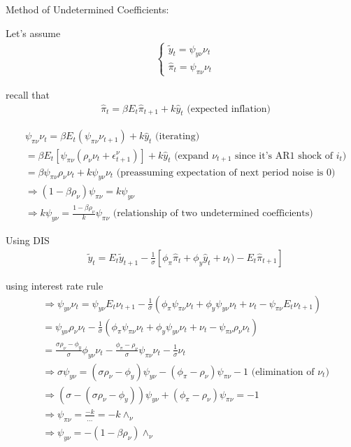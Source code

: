 \documentclass{article}
\begin{document}
Method of Undetermined Coefficients:

Let's assume 
\begin{align}
&\begin{cases}
  \tilde y_t = \psi_{y \nu} \nu_t
  \\
  \hat \pi_t = \psi_{\pi \nu} \nu_t
\end{cases}
\end{align}

recall that
\begin{align}
&\hat \pi_t = \beta E_t \hat \pi_{t+1}+k \hat y_t \text{ (expected inflation)}
\end{align}

\begin{align}
& \psi_{\pi \nu} \nu_t= \beta E_t (\psi_{\pi \nu} \nu_{t+1})+k \hat y_t \text{ (iterating)}
\\& = \beta E_t [\psi_{\pi \nu} (\rho_\nu \nu_t +\epsilon_{t+1}^\nu)]+k \hat y_t
\text{ (expand $\nu_{t+1}$ since it's AR1 shock of $i_t$)}
\\& = \beta \psi_{\pi \nu} \rho_\nu \nu_t + k \psi_{y \nu} \nu_t
\text{ (preassuming expectation of next period noise is $0$)}
\\& \Rightarrow (1-\beta \rho_\nu)\psi_{\pi \nu}=k \psi_{y \nu}
\\& \Rightarrow k \psi_{y \nu}=\frac{1-\beta \rho_\nu}{k}\psi_{\pi \nu}
\text{ (relationship of two undetermined coefficients)}
\end{align}

Using DIS
\begin{align}
& \tilde y_t =E_t \tilde y_{t+1}-\frac{1}{\sigma}[\phi_\pi \hat \pi_t+\phi_y \hat y_t +\nu_t)-E_t \hat \pi_{t+1}]
\end{align}

using interest rate rule
\begin{align}
& \Rightarrow \psi_{y \nu}\nu_t= \psi_{y \nu} E_t \nu_{t+1}-\frac{1}{\sigma}(\phi_\pi \psi_{\pi \nu}\nu_t+\phi_y \psi_{y \nu} \nu_t+\nu_t -\psi_{\pi \nu}E_t \nu_{t+1})
\\& = \psi_{y \nu}\rho_\nu \nu_t -\frac{1}{\sigma}(\phi_\pi \psi_{\pi \nu}\nu_t+\phi_y \psi_{y \nu} \nu_t+\nu_t -\psi_{\pi \nu}\rho_\nu \nu_t)  
\\& = \frac{\sigma \rho_\nu-\phi_y}{\sigma} \phi_{y \nu}\nu_t-\frac{\phi_\pi-\rho_\nu}{\sigma}\psi_{\pi \nu}\nu_t-\frac{1}{\sigma}\nu_t
\\& \Rightarrow 
\sigma \psi_{y \nu}=(\sigma \rho_\nu-\phi_y)\psi_{y \nu}-(\phi_\pi-\rho_\nu)\psi_{\pi \nu}-1\text{ (elimination of $\nu_t$)}
\\& \Rightarrow (\sigma-(\sigma \rho_\nu-\phi_y))
\psi_{y \nu}+(\phi_\pi-\rho_\nu)\psi_{\pi \nu}=-1
\\& \Rightarrow \psi_{\pi \nu}=\frac{-k}{\dots}=-k\wedge_\nu
\\& \Rightarrow \psi_{y \nu}=-(1-\beta \rho_\nu)\wedge_\nu
\end{align}
\end{document}
